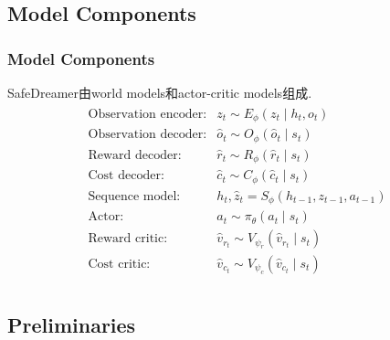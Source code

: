 \documentclass[10pt,mathserif]{beamer}%
\begin{document}
\subsection{Model Components}

\begin{frame}[t, fragile]
	\frametitle{Model Components}
	\begin{spacing}{1.5}
		SafeDreamer由world models和actor-critic models组成.
		\begin{equation*}
			\begin{split}
			\begin{array}{ll}
			\text {Observation encoder:} & z_t \sim E_\phi\left(z_t \mid h_t, o_t\right) \\ 
			\text {Observation decoder:} & \hat{o}_t \sim O_\phi\left(\hat{o}_t \mid s_t\right) \\
			\text {Reward decoder:} & \hat{r}_t \sim R_\phi\left(\hat{r}_t \mid s_t\right)  \\ 
			\text {Cost decoder:} & \hat{c}_t \sim C_\phi\left(\hat{c}_t \mid s_t\right) \\
			\text {Sequence model:} & h_t, \hat{z}_t=S_\phi\left(h_{t-1}, z_{t-1}, a_{t-1}\right) \\
			\text{Actor:} & a_{t} \sim \pi_{\theta}( a_t\mid s_t)\\
			\text{Reward critic:} & \hat{v}_{r_t} \sim V_{\psi_r}(\hat{v}_{r_t} \mid s_t)\\
			\text{Cost critic:} & \hat{v}_{c_t} \sim V_{\psi_c}(\hat{v}_{c_t} \mid s_t)\\
			\end{array}
			\end{split}
		\label{eq:definition}
		\end{equation*}
		
	\end{spacing}
\end{frame}

\subsection{Preliminaries}
\end{document}
